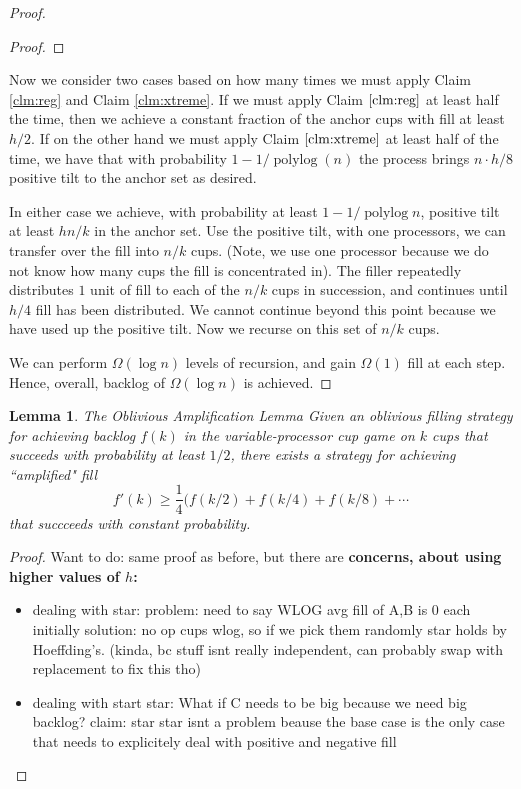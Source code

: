 \documentclass[twocolumn]{article}[11pt]
\DeclareMathOperator{\polylog}{\text{polylog}}
\newtheorem{lemma}{Lemma}
\begin{document}
\begin{proof}
\begin{proof}
\end{proof}

Now we consider two cases based on how many times we must apply Claim
\ref{clm:reg} and Claim \ref{clm:xtreme}. If we must apply Claim
$\ref{clm:reg}$ at least half the time, then we achieve a constant fraction of
the anchor cups with fill at least $h/2$. If on the other hand we must apply
Claim $\ref{clm:xtreme}$ at least half of the time, we have that with
probability $1- 1/\polylog(n)$ the process brings $n\cdot h/8$ positive tilt to
the anchor set as desired. 

  In either case we achieve, with probability at least $1-1/\polylog n$,
  positive tilt at least $hn/k$ in the anchor set.
  Use the positive tilt, with one processors, we can transfer over the fill into $n/k$ cups. 
  (Note, we use one processor because we do not know how many cups the fill is
  concentrated in). The filler repeatedly distributes $1$ unit of fill to each of the $n/k$ cups in succession, and continues until $h/4$ fill has been distributed. We cannot continue beyond this point because we have used up the positive tilt. Now we recurse on this set of $n/k$ cups.

  We can perform $\Omega(\log n)$ levels of recursion, and gain $\Omega(1)$
  fill at each step. Hence, overall, backlog of $\Omega(\log n)$ is achieved.
\end{proof}


\begin{lemma}{The Oblivious Amplification Lemma}
  Given an oblivious filling strategy for achieving backlog $f(k)$ in the
  variable-processor cup game on $k$ cups that succeeds with probability at
  least $1/2$, there exists a strategy for achieving ``amplified" fill $$f'(k)
  \ge \frac{1}{4}(f(k/2) + f(k/4) + f(k/8) + \cdots $$ that succceeds with constant probability.
\end{lemma}
\begin{proof}
  Want to do: same proof as before, but there are \textbf{concerns, about using higher values of $h$:}
\begin{itemize}
  \item dealing with star: problem: need to say WLOG avg fill of A,B is 0 each
    initially solution: no op cups wlog, so if we pick them randomly star holds
    by Hoeffding's. (kinda, bc stuff isnt really independent, can probably swap
    with replacement to fix this tho)
\item dealing with start star: What if C needs to be big because we need big
  backlog? claim: star star isnt a problem beause the base case is the only
  case that needs to explicitely deal with positive and negative fill
\end{itemize}
  
\end{proof}
\end{document}
